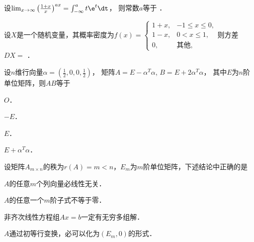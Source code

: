 \documentclass[plain,noanswer,medmath]{../../template/jnuexam}
\begin{document}






\begin{problem}
设$\lim_{x \to \infty} \left(\frac{1 + x}{x} \right)^{ax} = \int_{-\infty}^a t\e^t \dt$，
则常数$a$等于 \fillin{}．
\end{problem}








\begin{problem}
设$X$是一个随机变量，其概率密度为$f(x) =\begin{cases}
 1 + x, & -1 \le x \le 0, \\
 1 - x, & 0 < x \le 1, \\
     0, & \text{其他},
\end{cases}$则方差$DX =$ \fillin{}．
\end{problem}








\begin{problem}
设$n$维行向量$\alpha = \left(\frac{1}{2},0,0,\frac{1}{2} \right)$，
矩阵$A = E - \alpha^T\alpha$, $B = E + 2\alpha^T\alpha$，
其中$E$为$n$阶单位矩阵，则$AB$等于\pickout{}
\begin{abcd}
\item $O$．		
\item $- E$．		
\item $E$．		
\item $E + \alpha^T\alpha$．
\end{abcd}
\end{problem}


\begin{problem}
设矩阵$A_{m \times n}$的秩为$r(A) = m < n$，$E_m$为$m$阶单位矩阵，下述结论中正确的是\pickout{}
\begin{abcd}
\item $A$的任意$m$个列向量必线性无关．
\item $A$的任意一个$m$阶子式不等于零．
\item 非齐次线性方程组$Ax = b$一定有无穷多组解．
\item $A$通过初等行变换，必可以化为$(E_m,0)$的形式．
\end{abcd}
\end{problem}
\end{document}
